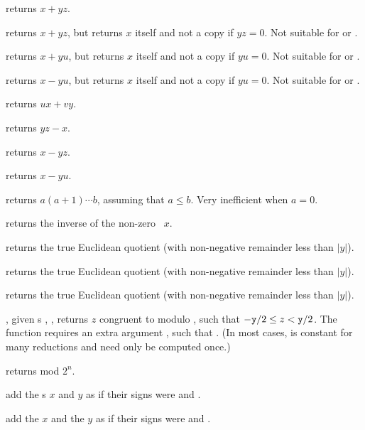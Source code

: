  returns $x + yz$.

 returns $x + yz$, but
returns $x$ itself and not a copy if $yz = 0$. Not suitable for
 or .

 returns $x +yu$, but
returns $x$ itself and not a copy if $yu = 0$. Not suitable for
 or .

 returns $x- yu$, but
returns $x$ itself and not a copy if $yu = 0$. Not suitable for
 or .

 returns $ux + vy$.

 returns $yz - x$.

 returns $x - yz$.

 returns $x -yu$.

 returns $a(a+1)\cdots b$, assuming
that $a \leq b$. Very inefficient when $a = 0$.

 returns the inverse of the non-zero ~$x$.

 returns the true Euclidean quotient
(with non-negative remainder less than $|y|$).

 returns the true Euclidean quotient
(with non-negative remainder less than $|y|$).

 returns the true Euclidean quotient
(with non-negative remainder less than $|y|$).

, given
s , , returns $z$ congruent to  modulo ,
such that $-{\tt y}/2 \leq z < {\tt y}/2$. The function requires an extra
argument , such that . (In most cases, 
is constant for many reductions and  need only be computed once.)

 returns  mod $2^n$.

 add the s
$x$ and $y$ as if their signs were  and .

add the  $x$ and the  $y$ as if their signs were 
and .

